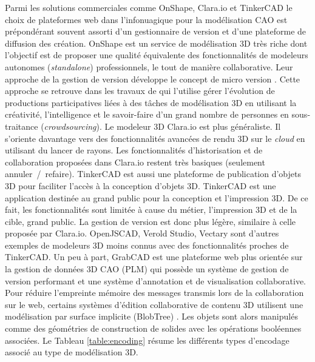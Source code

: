 Parmi les solutions commerciales comme OnShape, Clara.io et TinkerCAD le 
choix de plateformes web dans l'infonuagique pour la modélisation \gls{CAO} est 
prépondérant souvent assorti d'un gestionnaire de version et d'une plateforme de 
diffusion des création.
OnShape est un service de modélisation 3D très riche dont l'objectif est de 
proposer une qualité équivalente des fonctionnalités de modeleurs autonomes 
(\textit{standalone}) professionnels, le tout de manière collaborative. Leur approche 
de la gestion de version développe le concept de micro version \cite{Baran2015}. 
Cette approche se retrouve dans les travaux de \cite{Lu2016} qui l'utilise gérer 
l'évolution de productions participatives liées à des tâches de modélisation 
3D en utilisant la créativité, l'intelligence et le savoir-faire 
d'un grand nombre de personnes en sous-traitance (\textit{crowdsourcing}). Le 
modeleur 3D Clara.io \cite{Houston2013} est plus généraliste. Il s'oriente 
davantage vers des fonctionnalités avancées de rendu 3D sur le \textit{cloud} en 
utilisant du lancer de rayons. 
Les fonctionnalités d'historisation et de collaboration proposées 
dans Clara.io restent très basiques (seulement annuler~/~refaire). TinkerCAD 
est aussi une plateforme de publication d'objets 3D pour faciliter l'accès à la 
conception d'objets 3D. TinkerCAD est une application destinée au grand 
public pour la conception et l'impression 3D. De ce fait, les fonctionnalités sont 
limitée à cause du métier, l'impression 3D et de la cible, grand public. La gestion 
de version est donc plus légère, similaire à celle proposée par Clara.io. 
OpenJSCAD, Verold Studio, Vectary sont d'autres 
exemples de modeleurs 3D moins connus avec des fonctionnalités proches de 
TinkerCAD.
Un peu à part, GrabCAD est une plateforme web plus orientée sur la gestion de 
données 3D \gls{CAO} (\gls{PLM}) qui possède un système de gestion de version 
performant et une système d'annotation et de visualisation collaborative.
Pour réduire l'empreinte mémoire des messages transmis lors de la collaboration 
sur le web, certains systèmes d'édition collaborative de contenu 3D utilisent une 
modélisation par surface implicite (BlobTree) \cite{Grasberger2013}. 
Les objets sont alors manipulés comme des géométries de construction de 
solides avec les opérations booléennes associées. 
Le Tableau \ref{table:encoding} résume les différents types 
d'encodage associé au type de modélisation 3D. 
%
